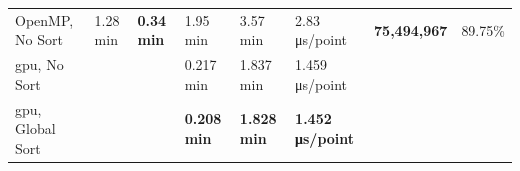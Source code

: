 \begin{table}
\begin{tabular}{l@{\hskip 0.06in}|lll|l|l|l|l}
    \cmidrule{1-8}
    OpenMP, No Sort & \multirow{\numExperiments}{*}{1.28 \si{\minute}} & \multirow{\numExperiments}{*}{\textbf{0.34 \si{\minute}}} & 1.95 \si{\minute} & 3.57 \si{\minute} & 2.83 \si{\micro\second}/point & \multirow{\numExperiments}{*}{\textbf{75,494,967}} & \multirow{\numExperiments}{*}{89.75\%}\\
    \acrshort{gpu}, No Sort & & & 0.217 \si{\minute} & 1.837 \si{\minute} & 1.459 \si{\micro\second}/point & &\\
    \acrshort{gpu}, Global Sort & & & \textbf{0.208 \si{\minute}} & \textbf{1.828 \si{\minute}} & \textbf{1.452 \si{\micro\second}/point} & &\\
    \bottomrule
    \end{tabular}
\end{table}
\renewcommand{\arraystretch}{1}

